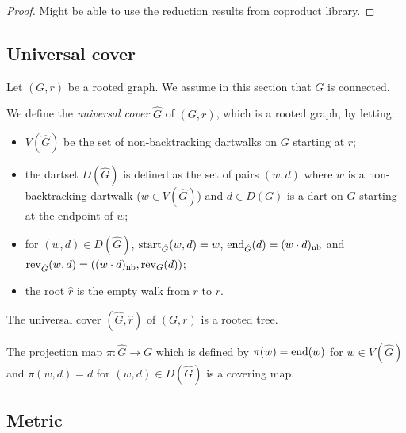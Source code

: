 \begin{proof}
  Might be able to use the reduction results from coproduct library.
\end{proof}

\subsection{Universal cover}

Let $(G,r)$ be a rooted graph. We assume in this section that $G$ is connected.

\begin{definition}
  \label{def:universal_cover}
  We define the \emph{universal cover} $\hat{G}$ of $(G,r)$, which is a rooted graph,
  by letting:
  \begin{itemize}
    \item $V(\hat G)$ be the set of non-backtracking dartwalks on $G$
    starting at $r$;
    \item the dartset $D(\hat{G})$ is defined as the set of pairs $(w,d)$ where
    $w$ is a non-backtracking dartwalk ($w \in V(\hat{G})$) and $d \in D(G)$
    is a dart on $G$ starting at the endpoint of $w$;
    \item for $(w,d) \in D(\hat{G})$, $\mathrm{start}_{\hat{G}}(w,d) = w$,
    $\mathrm{end}_{\hat{G}}(d) = (w \cdot d)_{\mathrm{nb}}$ and $\mathrm{rev}_{\hat{G}}(w,d) =
     ((w \cdot d)_{\mathrm{nb}},\mathrm{rev}_G(d))$;
    \item the root $\hat{r}$ is the empty walk from $r$ to $r$.
  \end{itemize}
\end{definition}

\begin{theorem}
  \label{thm:univ_cover_is_tree}
  The universal cover $(\hat{G}, \hat{r})$ of $(G,r)$ is a rooted tree.
\end{theorem}

\begin{theorem}
  \label{thm:univ_cover_cover}
  The projection map $\pi : \hat{G} \rightarrow G$ which is defined by $\pi(w)=\mathrm{end}(w)$
  for $w \in V(\hat G)$ and $\pi(w,d)=d$ for $(w,d) \in D(\hat G)$ is a covering map.
\end{theorem}

\subsection{Metric}

